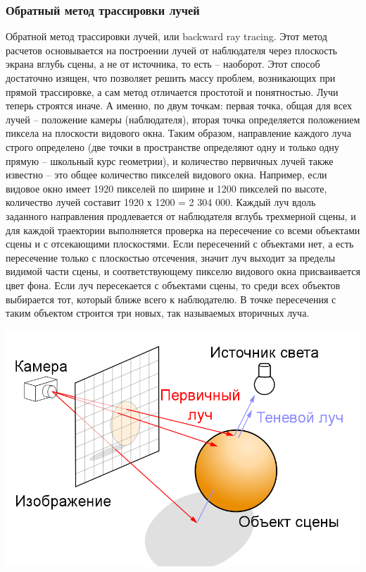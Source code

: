 \documentclass[12pt, a4paper]{article}
\begin{document}
\subsubsection{Обратный метод трассировки лучей}
Обратной метод трассировки лучей, или backward ray tracing. Этот метод расчетов основывается на построении лучей от наблюдателя через плоскость экрана вглубь сцены, а не от источника, то есть -- наоборот. Этот способ достаточно изящен, что позволяет решить массу проблем, возникающих при прямой трассировке, а сам метод отличается простотой и понятностью. Лучи теперь строятся иначе. А именно, по двум точкам: первая точка, общая для всех лучей – положение камеры (наблюдателя), вторая точка определяется положением пиксела на плоскости видового окна. Таким образом, направление каждого луча строго определено (две точки в пространстве определяют одну и только одну прямую – школьный курс геометрии), и количество первичных лучей также известно – это общее количество пикселей видового окна. Например, если видовое окно имеет 1920 пикселей по ширине и 1200 пикселей по высоте, количество лучей составит 1920 х 1200 = 2 304 000. Каждый луч
вдоль заданного направления продлевается от наблюдателя вглубь трехмерной сцены, и для каждой траектории выполняется проверка на пересечение со всеми объектами сцены и с отсекающими плоскостями. Если пересечений с объектами нет, а есть пересечение только с плоскостью отсечения, значит луч выходит за пределы видимой части сцены, и соответствующему пикселю видового окна присваивается цвет фона. Если луч пересекается с объектами сцены, то среди всех объектов выбирается тот, который ближе всего к наблюдателю. В точке пересечения с таким объектом строится три новых, так называемых вторичных луча. \par

\begin{center}
\includegraphics[scale=0.5]{imgs/Ray_trace_diagram_rus.png} 
\end{center}
\end{document}
